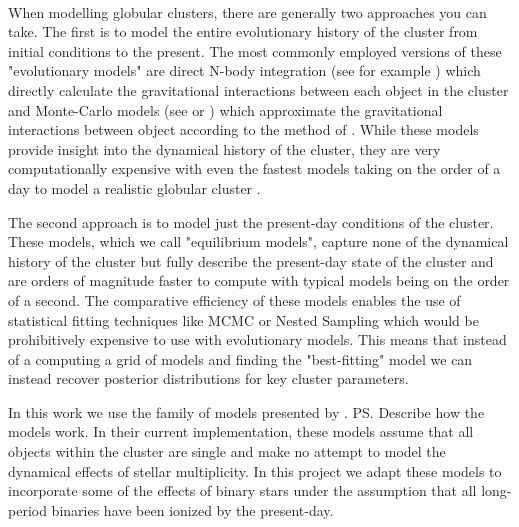 \paragraph{}
When modelling globular clusters, there are generally two approaches you can take. The first is to
model the entire evolutionary history of the cluster from initial conditions to the present. The
most commonly employed versions of these "evolutionary models" are direct N-body integration (see
for example \citet{Baumgardt2017a}) which directly calculate the gravitational interactions between
each object in the cluster and Monte-Carlo models (see \citet{Rodriguez2021} or \cite{Hypki2013})
which approximate the gravitational interactions between object according to the method of
\citet{Henon1971}. While these models provide insight into the dynamical history of the cluster,
they are very computationally expensive with even the fastest models taking on the order of a day
to model a realistic globular cluster \citep{Rodriguez2021}.

The second approach is to model just the present-day conditions of the cluster. These models, which
we call "equilibrium models", capture none of the dynamical history of the cluster but fully
describe the present-day state of the cluster and are orders of magnitude faster to compute with
typical models being on the order of a second. The comparative efficiency of these models enables
the use of statistical fitting techniques like MCMC or Nested Sampling which would be prohibitively
expensive to use with evolutionary models. This means that instead of a computing a grid of models
and finding the "best-fitting" model we can instead recover posterior distributions for key cluster
parameters.

In this work we use the  family of models presented by \citet{Gieles2015}. \ps{Describe
	how the models work}. In their current implementation, these models assume that all objects
within the cluster are single and make no attempt to model the dynamical effects of stellar
multiplicity. In this project we adapt these models to incorporate some of the effects of
binary stars under the assumption that all long-period binaries have been ionized by the
present-day.